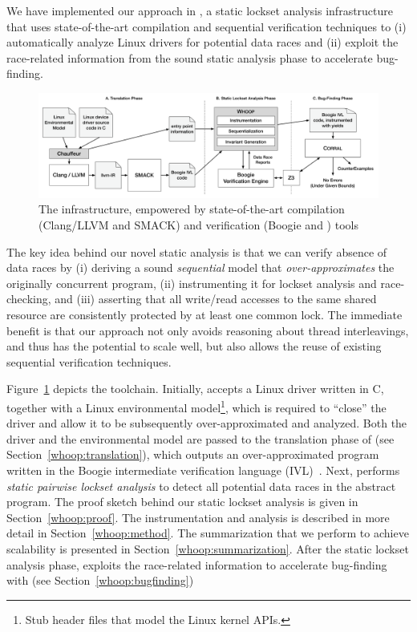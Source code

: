We have implemented our approach in \whoop, a static lockset analysis infrastructure that uses state-of-the-art compilation and sequential verification techniques to (i) automatically analyze Linux drivers for potential data races and (ii) exploit the race-related information from the sound static analysis phase to accelerate bug-finding.

\begin{figure}
\centering
\includegraphics[width=.99\linewidth]{img/whoop.pdf}
\caption{The \whoop infrastructure, empowered by state-of-the-art compilation (Clang/LLVM and SMACK) and verification (Boogie and \corral) tools}
\label{fig:whoop}
\end{figure}

The key idea behind our novel static analysis is that we can verify absence of data races by (i) deriving a sound \emph{sequential} model that \emph{over-approximates} the originally concurrent program, (ii) instrumenting it for lockset analysis and race-checking, and (iii) asserting that all write/read accesses to the same shared resource are consistently protected by at least one common lock. The immediate benefit is that our approach not only avoids reasoning about thread interleavings, and thus has the potential to scale well, but also allows the reuse of existing sequential verification techniques.

Figure~\ref{fig:whoop} depicts the \whoop toolchain. Initially, \whoop accepts a Linux driver written in C, together with a Linux environmental model\footnote{Stub header files that model the Linux kernel APIs.}, which is required to ``close'' the driver and allow it to be subsequently over-approximated and analyzed. Both the driver and the environmental model are passed to the translation phase of \whoop (see Section~\ref{whoop:translation}), which outputs an over-approximated program written in the Boogie intermediate verification language (IVL)~\cite{deline2005boogiepl}. Next, \whoop performs \emph{static pairwise lockset analysis} to detect all potential data races in the abstract program. The proof sketch behind our static lockset analysis is given in Section~\ref{whoop:proof}. The instrumentation and analysis is described in more detail in Section~\ref{whoop:method}. The summarization that we perform to achieve scalability is presented in Section~\ref{whoop:summarization}. After the static lockset analysis phase, \whoop exploits the race-related information to accelerate bug-finding with \corral (see Section~\ref{whoop:bugfinding})

